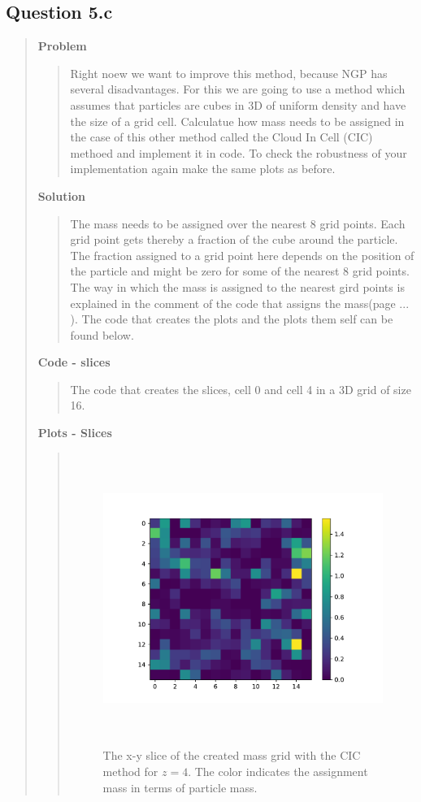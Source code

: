 
\subsection*{\textbf{Question 5.c}}
\begin{quote}

\textbf{Problem}
\begin{quote}
Right noew we want to improve this method, because NGP has several disadvantages. For this we are going to use a method which assumes that particles are cubes in 3D of uniform density and have the size of a grid cell. Calculatue how mass needs to be assigned in the case of this other method called the Cloud In Cell (CIC) methoed and implement it in code. To check the robustness of your implementation again make the same plots as before.
\end{quote}

\textbf{Solution} 
\begin{quote}
The mass needs to be assigned over the nearest 8 grid points. Each grid point gets thereby a fraction of the cube around the particle. The fraction assigned to a grid point here depends on the position of the particle and might be zero for some of the nearest 8 grid points. The way in which the mass is assigned to the nearest gird points is explained in the comment of the code that assigns the mass(page ... ). The code that creates the plots and the plots them self can be found below.
\newpage
\end{quote}

\textbf{Code - slices}
\begin{quote}
The code that creates the slices, cell 0 and cell 4 in a 3D grid of size 16.

\end{quote}

\newpage


\textbf{Plots - Slices}
\begin{quote}
\begin{figure}[!ht]
\centering
\includegraphics[width=14cm, height=9.5cm]{./Plots/5c_slice_4.pdf}
\caption{The x-y slice of the created mass grid with the CIC method for $z = 4$. The color indicates the assignment mass in terms of particle mass. }
\end{figure}


\end{quote}
\end{quote}
